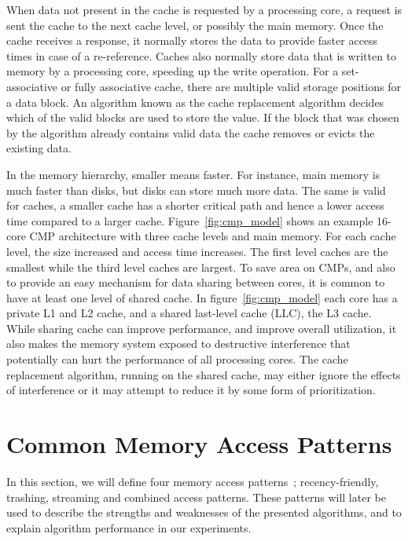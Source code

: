 When data not present in the cache is requested by a processing core, a request is sent the cache to the next cache level, or possibly the main memory.
Once the cache receives a response, it normally stores the data to provide faster access times in case of a re-reference.
Caches also normally store data that is written to memory by a processing core, speeding up the write operation.
For a set-associative or fully associative cache, there are multiple valid storage positions for a data block.
An algorithm known as the cache replacement algorithm decides which of the valid blocks are used to store the value.
If the block that was chosen by the algorithm already contains valid data the cache removes or evicts the existing data.

In the memory hierarchy, smaller means faster. 
For instance, main memory is much faster than disks, but disks can store much more data.
The same is valid for caches, a smaller cache has a shorter critical path and hence a lower access time compared to a larger cache.
Figure~\ref{fig:cmp_model} shows an example 16-core CMP architecture with three cache levels and main memory.
For each cache level, the size increased and access time increases.
The first level caches are the smallest while the third level caches are largest.
To save area on CMPs, and also to provide an easy mechanism for data sharing between cores, it is common to have at least one level of shared cache.
In figure~\ref{fig:cmp_model} each core has a private L1 and L2 cache, and a shared last-level cache (LLC), the L3 cache.
While sharing cache can improve performance, and improve overall utilization, it also makes the memory system exposed to destructive interference that potentially can hurt the performance of all processing cores. 
The cache replacement algorithm, running on the shared cache, may either ignore the effects of interference or it may attempt to reduce it by some form of prioritization.

\section{Common Memory Access Patterns}

In this section, we will define four memory access patterns~\cite{Jaleel2010}; recency-friendly, trashing, streaming and combined access patterns.
These patterns will later be used to describe the strengths and weaknesses of the presented algorithms, and to explain algorithm performance in our experiments.

